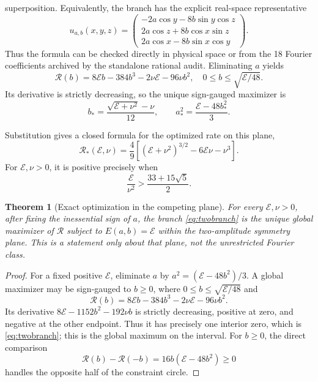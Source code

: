 \documentclass[11pt]{article}
\newtheorem{theorem}{Theorem}[section]
\newcommand{\E}{\mathcal{E}}
\newcommand{\rate}{\mathcal{R}}
\begin{document}
superposition.
Equivalently, the branch has the explicit real-space representative
\begin{equation}\label{eq:physicalbranch}
u_{a,b}(x,y,z)=
\begin{pmatrix}
-2a\cos y-8b\sin y\cos z\\
2a\cos z+8b\cos x\sin z\\
2a\cos x-8b\sin x\cos y
\end{pmatrix}.
\end{equation}
Thus the formula can be checked directly in physical space or from the 18
Fourier coefficients archived by the standalone rational audit.
Eliminating $a$ yields
\[
\rate(b)=8\E b-384b^3-2\nu\E-96\nu b^2,
\quad 0\leq b\leq\sqrt{\E/48}.
\]
Its derivative is strictly decreasing, so the unique sign-gauged maximizer is
\begin{equation}\label{eq:twobranch}
b_*=\frac{\sqrt{\E+\nu^2}-\nu}{12},\qquad
a_*^2=\frac{\E-48b_*^2}{3}.
\end{equation}

Substitution gives a closed formula for the optimized rate on this plane,
\begin{equation}\label{eq:tworate}
 \rate_*(\E,\nu)=\frac{4}{9}\left[(\E+\nu^2)^{3/2}
 -6\E\nu-\nu^3\right].
\end{equation}
For $\E,\nu>0$, it is positive precisely when
\[
 \frac{\E}{\nu^2}>\frac{33+15\sqrt5}{2}.
\]

\begin{theorem}[Exact optimization in the competing plane]
\label{thm:twoplaneglobal}
For every $\E,\nu>0$, after fixing the inessential sign of $a$, the branch
\eqref{eq:twobranch} is the unique global maximizer of $\rate$ subject to
$E(a,b)=\E$ within the two-amplitude symmetry plane.  This is a statement
only about that plane, not the unrestricted Fourier class.
\end{theorem}

\begin{proof}
For a fixed positive $\E$, eliminate $a$ by
$a^2=(\E-48b^2)/3$.  A global maximizer may be sign-gauged to $b\geq0$,
where $0\leq b\leq\sqrt{\E/48}$ and
\[
 \rate(b)=8\E b-384b^3-2\nu\E-96\nu b^2.
\]
Its derivative $8\E-1152b^2-192\nu b$ is strictly decreasing, positive at
zero, and negative at the other endpoint.  Thus it has precisely one interior
zero, which is \eqref{eq:twobranch}; this is the global maximum on the
interval.  For $b\geq0$, the direct comparison
\[
 \rate(b)-\rate(-b)=16b(\E-48b^2)\geq0
\]
handles the opposite half of the constraint circle.
\end{proof}
\end{document}
